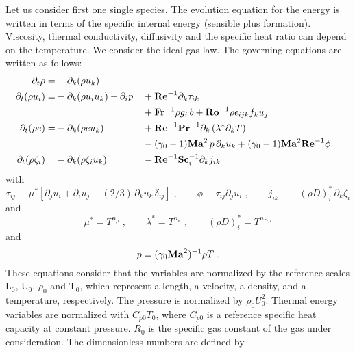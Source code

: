 Let us consider first one single species. The evolution equation for the energy is written in terms of the specific internal energy (sensible plus formation). Viscosity, thermal conductivity, diffusivity and the specific heat ratio can depend on the temperature. We consider the ideal gas law. The governing equations are written as follows:
\begin{subequations}
  \begin{align}
    \partial_t \rho       =& -\partial_k (\rho u_k)                                       \\
    \partial_t (\rho u_i) =& -\partial_k (\rho u_i u_k )- \partial_i p
    && +\mathrm{\bf Re}^{-1}\partial_k \tau_{ik}                                            \nonumber \\
    & && +\mathrm{\bf Fr}^{-1} \rho g_i\,b +\mathrm{\bf Ro}^{-1}\rho\epsilon_{ijk} f_ku_j                         \\
    \partial_t (\rho e)   =& -\partial_k (\rho e u_k )
    && +\mathrm{\bf Re}^{-1}\mathrm{\bf Pr}^{-1} \partial_k \left(\lambda^{*}\partial_kT\right)         \nonumber \\
    & &&-(\gamma_0-1)\mathrm{\bf Ma}^2\,p\, \partial_k u_k  + (\gamma_0-1)\mathrm{\bf Ma}^2\mathrm{\bf Re}^{-1}\phi           \\
    \partial_t (\rho \zeta_i) =& -\partial_k (\rho \zeta_i u_k)
    && -\mathrm{\bf Re}^{-1}\mathrm{\bf Sc}_i^{-1} \partial_k j_{ik}
  \end{align}
\end{subequations}
with
\begin{equation}
  \tau_{ij} \equiv \mu^*\left[\partial_j u_i +\partial_i u_j -(2/3)\, \partial_k u_k\,\delta_{ij}\right]\;,\qquad
  \phi      \equiv \tau_{ij} \partial_j u_i\;,\qquad
  j_{ik}    \equiv -(\rho D)_i^{*}\, \partial_k \zeta_i
\end{equation}
and
\begin{equation}
  \mu^{*} =  T^{n_\mu}\;,\qquad \lambda^{*} = T^{n_\kappa} \;,\qquad (\rho D)_i^{*}  =  T^{n_{D,i}}
\end{equation}
and
\begin{equation}
  p  = (\gamma_0 \mathrm{\bf Ma}^2)^{-1}\rho T \;.
  \label{eq:state}
\end{equation}
These equations consider that the variables are normalized by the reference scales $\mathrm{L}_0$, $\mathrm{U}_0$, $\rho_0$ and $\mathrm{T}_0$, which represent a length, a velocity, a density, and a temperature, respectively. The pressure is normalized by $\rho_0U_0^2$. Thermal energy variables are normalized with $C_{p0}T_0$, where $C_{p0}$ is a reference specific heat capacity at constant pressure. $R_0$ is the specific gas constant of the gas under consideration. The dimensionless numbers are defined by
